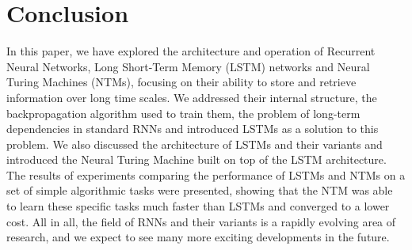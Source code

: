 \documentclass{article}
\begin{document}
\section{Conclusion}
\label{ch:5}

In this paper, we have explored the architecture and operation of Recurrent Neural
Networks, Long Short-Term Memory (LSTM) networks and Neural Turing Machines (NTMs),
focusing on their ability to store and retrieve information over long time scales. We
addressed their internal structure, the backpropagation algorithm used to train them, the
problem of long-term dependencies in standard RNNs and introduced LSTMs as a solution to
this problem. We also discussed the architecture of LSTMs and their variants and
introduced the Neural Turing Machine built on top of the LSTM architecture. The results of
experiments comparing the performance of LSTMs and NTMs on a set of simple algorithmic
tasks were presented, showing that the NTM was able to learn these specific tasks much
faster than LSTMs and converged to a lower cost. All in all, the field of RNNs and their
variants is a rapidly evolving area of research, and we expect to see many more exciting
developments in the future.



\newpage
\nocite{}


\end{document}
